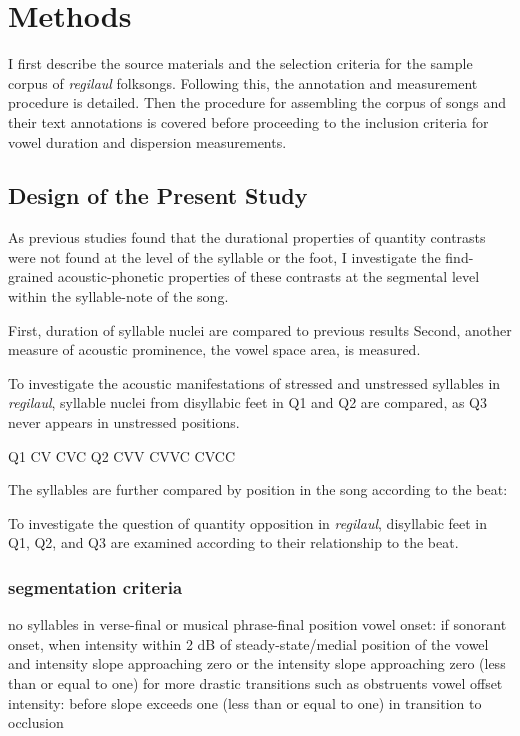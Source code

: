 \chapter{Methods}
%


I first describe the source materials and the selection criteria for the sample corpus of {\it regilaul} folksongs. Following this, the annotation and measurement procedure is detailed. Then the procedure for assembling the corpus of songs and their text annotations is covered before proceeding to the inclusion criteria for vowel duration and dispersion measurements.


\section{Design of the Present Study}

As previous studies found that the durational properties of quantity contrasts were not found at the level of the syllable or the foot, I investigate the find-grained acoustic-phonetic properties of these contrasts at the segmental level within the syllable-note of the song. 

First, duration of syllable nuclei are compared to previous results
Second, another measure of acoustic prominence, the vowel space area, is measured. 




To investigate the acoustic manifestations of stressed and unstressed syllables in {\it regilaul}, syllable nuclei from disyllabic feet in Q1 and Q2 are compared, as Q3 never appears in unstressed positions. 

Q1	CV 		CVC
Q2 	CVV		CVVC 	CVCC

The syllables are further compared by position in the song according to the beat: 

To investigate the question of quantity opposition in {\it regilaul}, disyllabic feet in Q1, Q2, and Q3 are examined according to their relationship to the beat. 



\subsection{segmentation criteria}

no syllables in verse-final or musical phrase-final position
vowel onset:
if sonorant onset, when intensity within 2 dB of steady-state/medial position of the vowel and intensity slope approaching zero
or the intensity slope approaching zero (less than or equal to one) for more drastic transitions such as obstruents
vowel offset intensity: before slope exceeds one (less than or equal to one) in transition to occlusion

